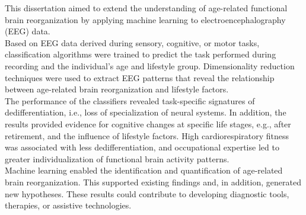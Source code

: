 This dissertation aimed to extend the understanding of age-related functional brain reorganization by applying machine learning to electroencephalography (EEG) data.\\
Based on EEG data derived during sensory, cognitive, or motor tasks, classification algorithms were trained to predict the task performed during recording and the individual's age and lifestyle group. Dimensionality reduction techniques were used to extract EEG patterns that reveal the relationship between age-related brain reorganization and lifestyle factors.\\
The performance of the classifiers revealed task-specific signatures of dedifferentiation, i.e., loss of specialization of neural systems. In addition, the results provided evidence for cognitive changes at specific life stages, e.g., after retirement, and the influence of lifestyle factors. High cardiorespiratory fitness was associated with less dedifferentiation, and occupational expertise led to greater individualization of functional brain activity patterns.\\
Machine learning enabled the identification and quantification of age-related brain reorganization. This supported existing findings and, in addition, generated new hypotheses. These results could contribute to developing diagnostic tools, therapies, or assistive technologies.